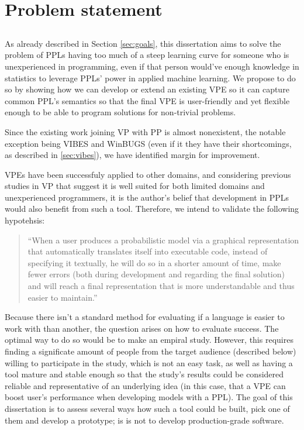 \chapter{Problem statement}\label{chap:chap3}

\section*{}

As already described in Section \ref{sec:goals}, this dissertation aims to solve
the problem of PPLs having too much of a steep learning curve for someone who
is unexperienced in programming, even if that person would've enough knowledge
in statistics to leverage PPLs' power in applied machine learning. We propose
to do so by showing how we can develop or extend an existing VPE so it can capture common PPL's
semantics so that the final VPE is user-friendly
and yet flexible enough to be able to program solutions for non-trivial problems.

Since the existing work joining VP with PP is almost nonexistent, the notable exception
being VIBES and WinBUGS (even if it they have their shortcomings, as described in \ref{sec:vibes}),
we have identified margin for improvement.

VPEs have been successfuly
applied to other domains, and considering previous studies in VP that suggest it is
well suited for both limited domains and unexperienced programmers, it is the
author's belief that development in PPLs would also benefit from such a tool.
Therefore, we intend to validate the following hypotehsis:

\begin{quote}
  ``When a user produces a probabilistic model via a graphical representation that automatically translates
  itself into executable code, instead of specifying it textually,
  he will do so in a shorter amount of time, make
  fewer errors (both during development and regarding the final solution) and
  will reach a final representation that is more understandable and thus
  easier to maintain.''
\end{quote}

Because there isn't a standard method for evaluating if a language is easier
to work with than another, the question arises on how to evaluate success.
The optimal way to do so would be to make an empiral
study. However, this requires finding a significate amount of people from the
target audience (described below) willing to participate in the study, which
is not an easy task, as well as having a tool mature and stable enough so that the
study's results could be considered reliable and representative of an underlying
idea (in this case, that a VPE can boost user's performance when developing
models with a PPL). The goal of this dissertation is to
assess several ways how such a tool could be built, pick one of them and develop
a prototype; is is not to develop production-grade software.

